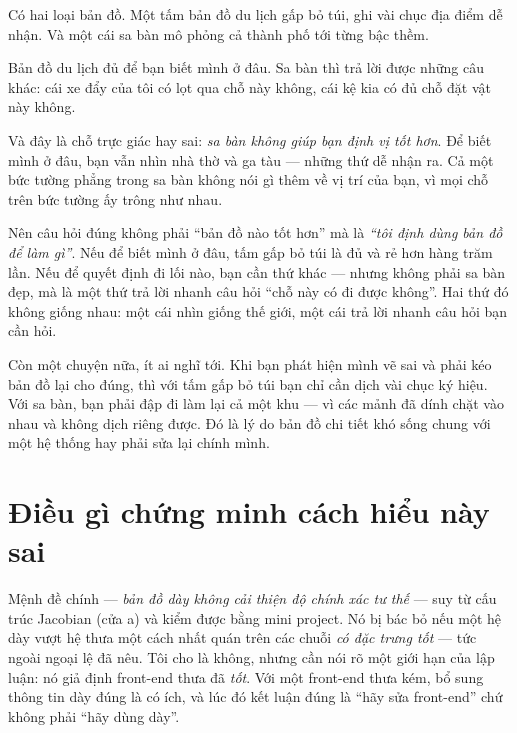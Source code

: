 \documentclass[../../vslam.tex]{subfiles}
\begin{document}
\begin{dongian}
Có hai loại bản đồ. Một tấm bản đồ du lịch gấp bỏ túi, ghi vài chục địa điểm dễ nhận. Và một cái sa bàn mô phỏng cả thành phố tới từng bậc thềm.

Bản đồ du lịch đủ để bạn biết mình ở đâu. Sa bàn thì trả lời được những câu khác: cái xe đẩy của tôi có lọt qua chỗ này không, cái kệ kia có đủ chỗ đặt vật này không.

Và đây là chỗ trực giác hay sai: \emph{sa bàn không giúp bạn định vị tốt hơn}. Để biết mình ở đâu, bạn vẫn nhìn nhà thờ và ga tàu --- những thứ dễ nhận ra. Cả một bức tường phẳng trong sa bàn không nói gì thêm về vị trí của bạn, vì mọi chỗ trên bức tường ấy trông như nhau.

Nên câu hỏi đúng không phải ``bản đồ nào tốt hơn'' mà là \emph{``tôi định dùng bản đồ để làm gì''}. Nếu để biết mình ở đâu, tấm gấp bỏ túi là đủ và rẻ hơn hàng trăm lần. Nếu để quyết định đi lối nào, bạn cần thứ khác --- nhưng không phải sa bàn đẹp, mà là một thứ trả lời nhanh câu hỏi ``chỗ này có đi được không''. Hai thứ đó không giống nhau: một cái nhìn giống thế giới, một cái trả lời nhanh câu hỏi bạn cần hỏi.

Còn một chuyện nữa, ít ai nghĩ tới. Khi bạn phát hiện mình vẽ sai và phải kéo bản đồ lại cho đúng, thì với tấm gấp bỏ túi bạn chỉ cần dịch vài chục ký hiệu. Với sa bàn, bạn phải đập đi làm lại cả một khu --- vì các mảnh đã dính chặt vào nhau và không dịch riêng được. Đó là lý do bản đồ chi tiết khó sống chung với một hệ thống hay phải sửa lại chính mình.

\end{dongian}

\section{Điều gì chứng minh cách hiểu này sai}

Mệnh đề chính --- \emph{bản đồ dày không cải thiện độ chính xác tư thế} --- suy từ cấu trúc Jacobian (cửa a) và kiểm được bằng mini project. Nó bị bác bỏ nếu một hệ dày vượt hệ thưa một cách nhất quán trên các chuỗi \emph{có đặc trưng tốt} --- tức ngoài ngoại lệ đã nêu. Tôi cho là không, nhưng cần nói rõ một giới hạn của lập luận: nó giả định front-end thưa đã \emph{tốt}. Với một front-end thưa kém, bổ sung thông tin dày đúng là có ích, và lúc đó kết luận đúng là ``hãy sửa front-end'' chứ không phải ``hãy dùng dày''.
\end{document}
